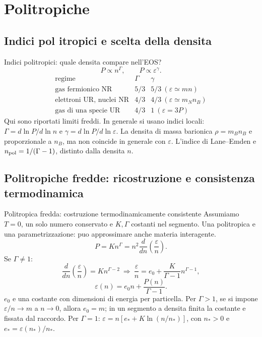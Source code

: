 \section{Politropiche}

\subsection{Indici pol itropici e scelta della densita}

\begin{frame}[t]{Indici politropici: quale densita compare nell'EOS?}
\vspace*{3mm}
\small
\[
P\propto n^\Gamma,\qquad P\propto\varepsilon^\gamma.
\]
\[
\begin{array}{l|c|c}
\text{regime}&\Gamma&\gamma\\\hline
\text{gas fermionico NR}&5/3&5/3\ (\varepsilon\simeq mn)\\
\text{elettroni UR, nuclei NR}&4/3&4/3\ (\varepsilon\simeq m_N n_B)\\
\text{gas di una specie UR}&4/3&1\ (\varepsilon=3P)
\end{array}
\]
Qui sono riportati limiti freddi. In generale si usano indici locali:
$\Gamma=d\ln P/d\ln n$ e $\gamma=d\ln P/d\ln\varepsilon$.
\smallskip
La densita di massa barionica $\rho=m_Bn_B$ e proporzionale a $n_B$,
ma non coincide in generale con $\varepsilon$.
L'indice di Lane--Emden e $n_{\rm pol}=1/(\Gamma-1)$, distinto dalla densita $n$.
\end{frame}

\subsection{Politropiche fredde: ricostruzione e consistenza termodinamica}

\begin{frame}[t]{Politropica fredda: costruzione termodinamicamente consistente}
\vspace*{3mm}
\small
Assumiamo $T=0$, un solo numero conservato e $K,\Gamma$ costanti nel segmento.
Una politropica e una parametrizzazione: puo approssimare anche materia interagente.
\[
P=Kn^\Gamma=n^2\frac{d}{dn}\left(\frac\varepsilon n\right).
\]
Se $\Gamma\ne1$:
\[
\frac{d}{dn}\left(\frac\varepsilon n\right)=Kn^{\Gamma-2}
\ \Longrightarrow\ \frac\varepsilon n=e_0+\frac{K}{\Gamma-1}n^{\Gamma-1},
\]
\[
\boxed{\varepsilon(n)=e_0n+\frac{P(n)}{\Gamma-1}.}
\]
$e_0$ e una costante con dimensioni di energia per particella.
Per $\Gamma>1$, se si impone $\varepsilon/n\to m$ a $n\to0$, allora $e_0=m$;
in un segmento a densita finita la costante e fissata dal raccordo.
\smallskip
Per $\Gamma=1$: $\varepsilon=n[e_*+K\ln(n/n_*)]$, con $n_*>0$ e $e_*=\varepsilon(n_*)/n_*$.
\end{frame}

